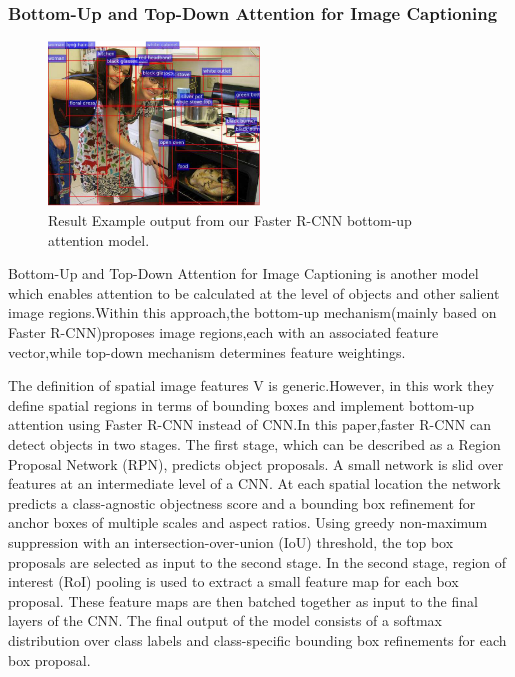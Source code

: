 \documentclass[xelatex,a4j,10pt,twocolumn]{article}
\begin{document}
\subsubsection{Bottom-Up and Top-Down Attention for Image Captioning}
\begin{figure}[h]
	\centering
    \includegraphics[width=0.5\textwidth]{4.png}
 	\caption{Result Example output from our Faster R-CNN bottom-up attention model.}
 	\label{fig:4}
\end{figure}
Bottom-Up and Top-Down Attention for Image Captioning \cite{3BUTD}is another model which enables attention to be calculated at the level of objects and other salient image regions.Within this approach,the bottom-up mechanism(mainly based on Faster R-CNN)proposes image regions,each with an associated feature vector,while top-down mechanism determines feature weightings.

The definition of spatial image features V is generic.However, in this work they define spatial regions in terms of bounding boxes and implement bottom-up attention using Faster R-CNN instead of CNN.In this paper,faster R-CNN can detect objects in two stages. The first stage, which can be described as a Region Proposal Network (RPN), predicts object proposals. A small network is slid over features at an intermediate level of a CNN. At each spatial location the network predicts a class-agnostic objectness score and a bounding box refinement for anchor boxes of multiple scales and aspect ratios. Using greedy non-maximum suppression with an intersection-over-union (IoU) threshold, the top box proposals are selected as input to the second stage. In the second stage, region of interest (RoI) pooling is used to extract a small feature map for each box proposal. These feature maps are then batched together as input to the final layers of the CNN. The final output of the model consists of a softmax distribution over class labels and class-specific bounding box refinements for each box proposal.
\end{document}
